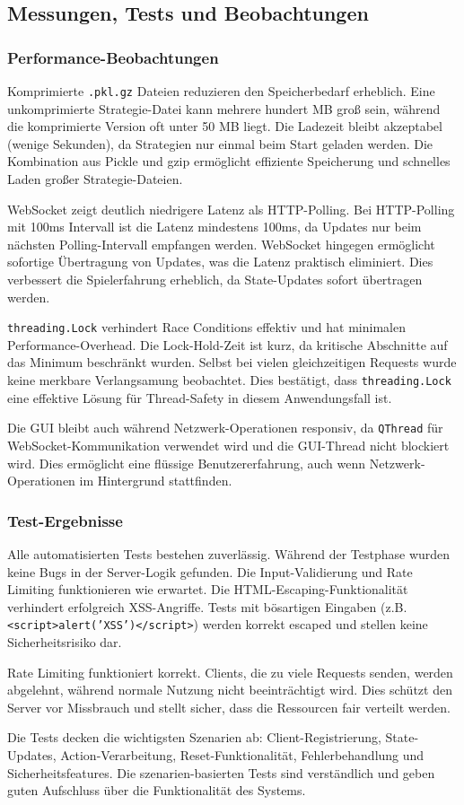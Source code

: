 \subsection{Messungen, Tests und Beobachtungen}

\subsubsection{Performance-Beobachtungen}

Komprimierte \texttt{.pkl.gz} Dateien reduzieren den Speicherbedarf erheblich.
Eine unkomprimierte Strategie-Datei kann mehrere hundert MB groß sein, während die komprimierte Version oft unter 50 MB liegt.
Die Ladezeit bleibt akzeptabel (wenige Sekunden), da Strategien nur einmal beim Start geladen werden.
Die Kombination aus Pickle und gzip ermöglicht effiziente Speicherung und schnelles Laden großer Strategie-Dateien.

WebSocket zeigt deutlich niedrigere Latenz als HTTP-Polling.
Bei HTTP-Polling mit 100ms Intervall ist die Latenz mindestens 100ms, da Updates nur beim nächsten Polling-Intervall empfangen werden.
WebSocket hingegen ermöglicht sofortige Übertragung von Updates, was die Latenz praktisch eliminiert.
Dies verbessert die Spielerfahrung erheblich, da State-Updates sofort übertragen werden.

\texttt{threading.Lock} verhindert Race Conditions effektiv und hat minimalen Performance-Overhead.
Die Lock-Hold-Zeit ist kurz, da kritische Abschnitte auf das Minimum beschränkt wurden.
Selbst bei vielen gleichzeitigen Requests wurde keine merkbare Verlangsamung beobachtet.
Dies bestätigt, dass \texttt{threading.Lock} eine effektive Lösung für Thread-Safety in diesem Anwendungsfall ist.

Die GUI bleibt auch während Netzwerk-Operationen responsiv, da \texttt{QThread} für WebSocket-Kommunikation verwendet wird und die GUI-Thread nicht blockiert wird.
Dies ermöglicht eine flüssige Benutzererfahrung, auch wenn Netzwerk-Operationen im Hintergrund stattfinden.

\subsubsection{Test-Ergebnisse}

Alle automatisierten Tests bestehen zuverlässig.
Während der Testphase wurden keine Bugs in der Server-Logik gefunden.
Die Input-Validierung und Rate Limiting funktionieren wie erwartet.
Die HTML-Escaping-Funktionalität verhindert erfolgreich XSS-Angriffe.
Tests mit bösartigen Eingaben (z.B. \texttt{<script>alert('XSS')</script>}) werden korrekt escaped und stellen keine Sicherheitsrisiko dar.

Rate Limiting funktioniert korrekt.
Clients, die zu viele Requests senden, werden abgelehnt, während normale Nutzung nicht beeinträchtigt wird.
Dies schützt den Server vor Missbrauch und stellt sicher, dass die Ressourcen fair verteilt werden.

Die Tests decken die wichtigsten Szenarien ab: Client-Registrierung, State-Updates, Action-Verarbeitung, Reset-Funktionalität, Fehlerbehandlung und Sicherheitsfeatures.
Die szenarien-basierten Tests sind verständlich und geben guten Aufschluss über die Funktionalität des Systems.
